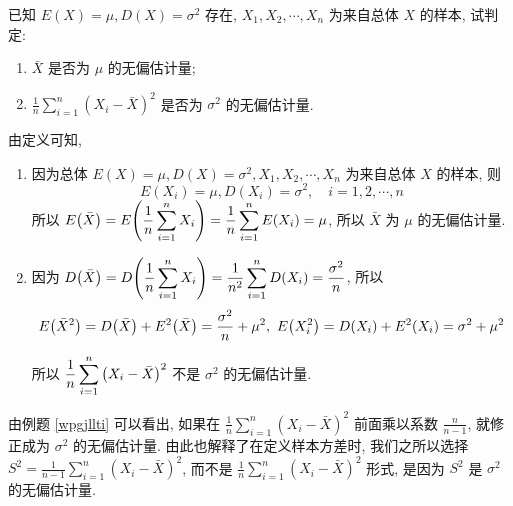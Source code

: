 \begin{example}
    已知 $E(X)=\mu, D(X)=\sigma^{2} $ 存在, $ X_{1}, X_{2}, \cdots, X_{n} $ 为来自总体 $ X $ 的样本, 试判定:\label{wpgjllti}
    \begin{enumerate}[label=(\arabic{*})]
        \item $\bar{X} $ 是否为 $ \mu $ 的无偏估计量;
        \item $\displaystyle\frac{1}{n} \sum_{i=1}^{n}\left(X_{i}-\bar{X}\right)^{2} $ 是否为 $ \sigma^{2} $ 的无偏估计量.
    \end{enumerate}
\end{example}
\begin{solution}
    由定义可知, 
    \begin{enumerate}[label=(\arabic{*})]
        \item 因为总体 $ E(X)=\mu, D(X)=\sigma^{2}, X_{1}, X_{2}, \cdots, X_{n} $ 为来自总体 $ X $ 的样本, 则
              $$E\left(X_{i}\right)=\mu, D\left(X_{i}\right)=\sigma^{2}, \quad i=1,2, \cdots, n $$
              所以 $\displaystyle E\qty(\bar{X})=E\qty(\dfrac{1}{n}\sum_{i=1}^{n}X_i)=\dfrac{1}{n}\sum_{i=1}^{n}E(X_i)=\mu$, 
              所以 $\bar{X} $ 为 $ \mu $ 的无偏估计量.
        \item 因为 $\displaystyle D\qty(\bar{X})=D\qty(\dfrac{1}{n}\sum_{i=1}^{n}X_i)=\dfrac{1}{n^2}\sum_{i=1}^{n}D(X_i)=\dfrac{\sigma^2}{n}$, 所以
              $$E\qty(\bar{X}^2)=D\qty(\bar{X})+E^2\qty(\bar{X})=\dfrac{\sigma^2}{n}+\mu^2,~E\qty(X_i^2)=D(X_i)+E^2(X_i)=\sigma^2+\mu^2$$
              所以 $\displaystyle\dfrac{1}{n}\sum_{i=1}^{n}\qty(X_i-\bar{X})^2$ 不是 $\sigma^2$ 的无偏估计量.
    \end{enumerate}
\end{solution}

由例题 \ref{wpgjllti} 可以看出, 如果在 $ \displaystyle\frac{1}{n} \sum_{i=1}^{n}\left(X_{i}-\bar{X}\right)^{2} $ 前面乘以系数
$ \displaystyle\frac{n}{n-1} $, 就修正成为 $ \sigma^{2} $ 的无偏估计量.
由此也解释了在定义样本方差时, 我们之所以选择 $\displaystyle S^{2}=\frac{1}{n-1} \sum_{i=1}^{n}\left(X_{i}-\bar{X}\right)^{2}$, 
而不是 $\displaystyle \frac{1}{n} \sum_{i=1}^{n}\left(X_{i}-\bar{X}\right)^{2} $ 形式, 是因为 $ S^{2} $ 是 $ \sigma^{2} $ 的无偏估计量.


